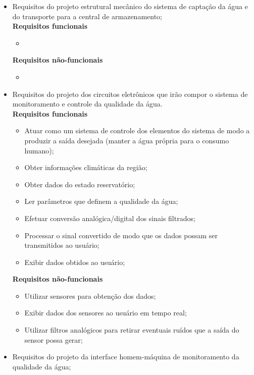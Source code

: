     \begin{itemize}
      \item Requisitos do projeto estrutural mecânico do sistema de captação da água e do transporte para a central de armazenamento;\\
	
	\textbf{Requisitos funcionais}
	\begin{itemize}
	  \item 
	\end{itemize}
	
	\textbf{Requisitos não-funcionais}
	\begin{itemize}
	  \item 
	\end{itemize}
	
      \item Requisitos do projeto dos circuitos eletrônicos que irão compor o sistema de monitoramento e controle da qualidade da água.\\
	
	\textbf{Requisitos funcionais}
	\begin{itemize}
	  \item Atuar como um sistema de controle dos elementos do sistema de modo a produzir a saída desejada (manter a água própria para o consumo humano);
	  \item Obter informações climáticas da região;
	  \item Obter dados do estado reservatório;
	  \item Ler parâmetros que definem a qualidade da água;
	  \item Efetuar conversão analógica/digital dos sinais filtrados;
	  \item Processar o sinal convertido de modo que os dados possam ser transmitidos ao usuário;
	  \item Exibir dados obtidos ao usuário;
	\end{itemize}
	
	\textbf{Requisitos não-funcionais}
	\begin{itemize}
	  \item Utilizar sensores para obtenção dos dados;
	  \item Exibir dados dos sensores ao usuário em tempo real;
	  \item Utilizar filtros analógicos para retirar eventuais ruídos que a saída do sensor possa gerar;
	\end{itemize}
	
      \item Requisitos do projeto da interface homem-máquina de monitoramento da qualidade da água;\\
	

\end{itemize}
